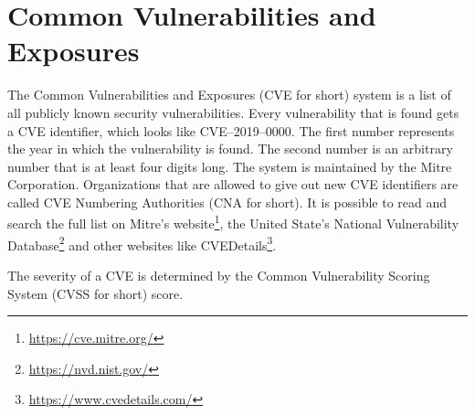 \section{Common Vulnerabilities and Exposures}
The Common Vulnerabilities and Exposures (CVE for short) system is a list of all publicly known security vulnerabilities. Every vulnerability that is found gets a CVE identifier, which looks like CVE--2019--0000. The first number represents the year in which the vulnerability is found. The second number is an arbitrary number that is at least four digits long. The system is maintained by the Mitre Corporation. Organizations that are allowed to give out new CVE identifiers are called CVE Numbering Authorities (CNA for short). It is possible to read and search the full list on Mitre's website\footnote{\url{https://cve.mitre.org/}}, the United State's National Vulnerability Database\footnote{\url{https://nvd.nist.gov/}} and other websites like CVEDetails\footnote{\url{https://www.cvedetails.com/}}.

The severity of a CVE is determined by the Common Vulnerability Scoring System (CVSS for short) score.

